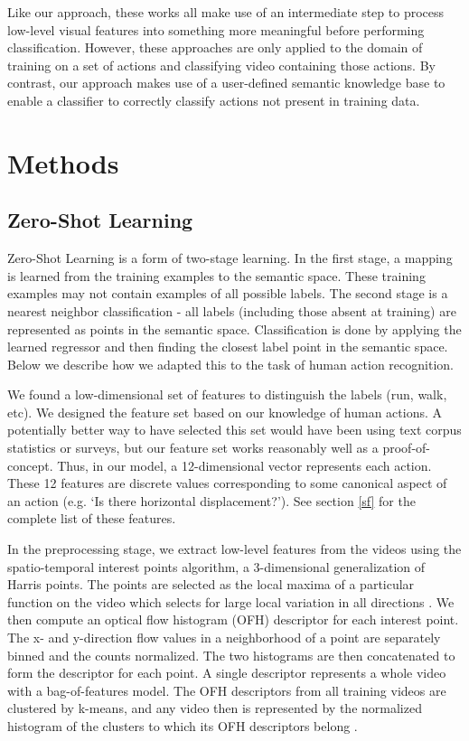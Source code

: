\documentclass{article}
\begin{document}
Like our approach, these works all make use of an intermediate step to process low-level visual features into something more meaningful before performing classification. However, these approaches are only applied to the domain of training on a set of actions and classifying video containing those actions. By contrast, our approach makes use of a user-defined semantic knowledge base to enable a classifier to correctly classify actions not present in training data.

\section{Methods}
\subsection{Zero-Shot Learning}
Zero-Shot Learning is a form of two-stage learning. In the first stage, a mapping is learned from the training examples to the semantic space. These training examples may not contain examples of all possible labels. The second stage is a nearest neighbor classification - all labels (including those absent at training) are represented as points in the semantic space.  Classification is done by applying the learned regressor and then finding the closest label point in the semantic space.  Below we describe how we adapted this to the task of human action recognition.

We found a low-dimensional set of features to distinguish the labels (run, walk, etc). We designed the feature set based on our knowledge of human actions. A potentially better way to have selected this set would have been using text corpus statistics or surveys, but our feature set works reasonably well as a proof-of-concept. Thus, in our model, a 12-dimensional vector represents each action. These 12 features are discrete values corresponding to some canonical aspect of an action (e.g. `Is there horizontal displacement?'). See section \ref{sf} for the complete list of these features.

In the preprocessing stage, we extract low-level features from the videos using the spatio-temporal interest points algorithm, a 3-dimensional generalization of Harris points. The points are selected as the local maxima of a particular function on the video which selects for large local variation in all directions \cite{Laptev05}. We then compute an optical flow histogram (OFH) descriptor for each interest point. The x- and y-direction flow values in a neighborhood of a point are separately binned and the counts normalized. The two histograms are then concatenated to form the descriptor for each point. A single descriptor represents a whole video with a bag-of-features model. The OFH descriptors from all training videos are clustered by k-means, and any video then is represented by the normalized histogram of the clusters to which its OFH descriptors belong \cite{Laptev04}.
\end{document}
